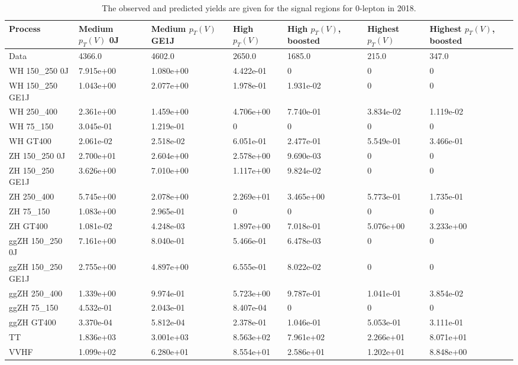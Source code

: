 \begin{table}
\centering
\caption[2018 0-lepton signal selection yields]{
                  The observed and predicted yields are given for the
                  signal regions for 0-lepton in 2018.
                  }
{\footnotesize
\begin{tabularx}{\textwidth}{|X|X|X|X|X|X|X|}
\hline
Process & Medium $p_{T}(V)$ 0J & Medium $p_{T}(V)$ GE1J & High $p_{T}(V)$ & High $p_{T}(V)$, boosted & Highest $p_{T}(V)$ & Highest $p_{T}(V)$, boosted \\
\hline
Data & 4366.0 & 4602.0 & 2650.0 & 1685.0 & 215.0 & 347.0 \\
\hline
WH 150\_250 0J & 7.915e+00 & 1.080e+00 & 4.422e-01 & 0 & 0 & 0 \\
WH 150\_250 GE1J & 1.043e+00 & 2.077e+00 & 1.978e-01 & 1.931e-02 & 0 & 0 \\
WH 250\_400 & 2.361e+00 & 1.459e+00 & 4.706e+00 & 7.740e-01 & 3.834e-02 & 1.119e-02 \\
WH 75\_150 & 3.045e-01 & 1.219e-01 & 0 & 0 & 0 & 0 \\
WH GT400 & 2.061e-02 & 2.518e-02 & 6.051e-01 & 2.477e-01 & 5.549e-01 & 3.466e-01 \\
ZH 150\_250 0J & 2.700e+01 & 2.604e+00 & 2.578e+00 & 9.690e-03 & 0 & 0 \\
ZH 150\_250 GE1J & 3.626e+00 & 7.010e+00 & 1.117e+00 & 9.824e-02 & 0 & 0 \\
ZH 250\_400 & 5.745e+00 & 2.078e+00 & 2.269e+01 & 3.465e+00 & 5.773e-01 & 1.735e-01 \\
ZH 75\_150 & 1.083e+00 & 2.965e-01 & 0 & 0 & 0 & 0 \\
ZH GT400 & 1.081e-02 & 4.248e-03 & 1.897e+00 & 7.018e-01 & 5.076e+00 & 3.233e+00 \\
ggZH 150\_250 0J & 7.161e+00 & 8.040e-01 & 5.466e-01 & 6.478e-03 & 0 & 0 \\
ggZH 150\_250 GE1J & 2.755e+00 & 4.897e+00 & 6.555e-01 & 8.022e-02 & 0 & 0 \\
ggZH 250\_400 & 1.339e+00 & 9.974e-01 & 5.723e+00 & 9.787e-01 & 1.041e-01 & 3.854e-02 \\
ggZH 75\_150 & 4.532e-01 & 2.043e-01 & 8.407e-04 & 0 & 0 & 0 \\
ggZH GT400 & 3.370e-04 & 5.812e-04 & 2.378e-01 & 1.046e-01 & 5.053e-01 & 3.111e-01 \\
\hline
TT & 1.836e+03 & 3.001e+03 & 8.563e+02 & 7.961e+02 & 2.266e+01 & 8.071e+01 \\
VVHF & 1.099e+02 & 6.280e+01 & 8.554e+01 & 2.586e+01 & 1.202e+01 & 8.848e+00 \\

\end{tabularx}}
\end{table}
